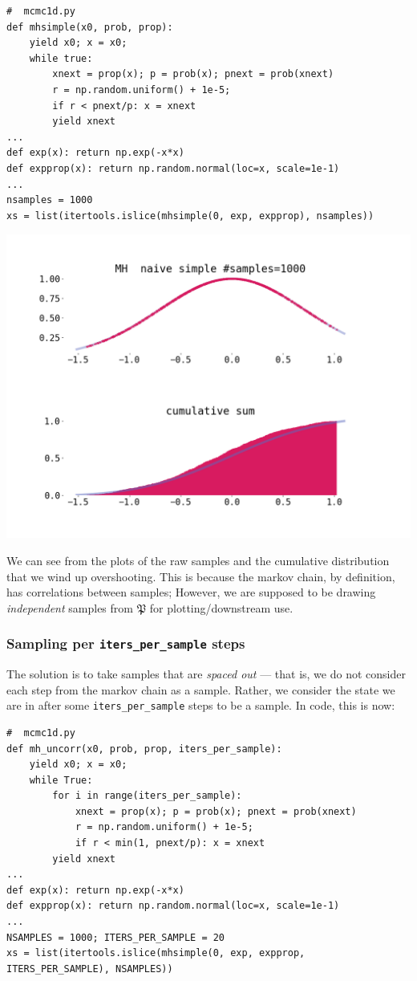 \documentclass[titlepage]{article}
\renewcommand{\P}{\mathfrak{P}}
\begin{document}
{\footnotesize
\begin{verbatim}
#  mcmc1d.py
def mhsimple(x0, prob, prop):
    yield x0; x = x0;
    while true:
        xnext = prop(x); p = prob(x); pnext = prob(xnext)
        r = np.random.uniform() + 1e-5;
        if r < pnext/p: x = xnext
        yield xnext
...
def exp(x): return np.exp(-x*x)
def expprop(x): return np.random.normal(loc=x, scale=1e-1)
...
nsamples = 1000
xs = list(itertools.islice(mhsimple(0, exp, expprop), nsamples))
\end{verbatim}
}

\includegraphics[width=\textwidth]{mcmc-mh-simple-1d-exp.png}

We can see from the plots of the raw samples and the cumulative distribution
that we wind up overshooting. This is because the markov chain, by definition,
has correlations between samples; However, we are supposed to be drawing
\emph{independent} samples from $\P$ for plotting/downstream use.

\subsubsection{Sampling per \texttt{iters\_per\_sample} steps}

The solution is to take samples that are \emph{spaced out} --- that is,
we do not consider each step from the markov chain as a sample. Rather,
we consider the state we are in after some \texttt{iters\_per\_sample} steps to be a sample.
In code, this is now:

{\footnotesize
\begin{verbatim}
#  mcmc1d.py
def mh_uncorr(x0, prob, prop, iters_per_sample):
    yield x0; x = x0;
    while True:
        for i in range(iters_per_sample):
            xnext = prop(x); p = prob(x); pnext = prob(xnext)
            r = np.random.uniform() + 1e-5;
            if r < min(1, pnext/p): x = xnext
        yield xnext
...
def exp(x): return np.exp(-x*x)
def expprop(x): return np.random.normal(loc=x, scale=1e-1)
...
NSAMPLES = 1000; ITERS_PER_SAMPLE = 20
xs = list(itertools.islice(mhsimple(0, exp, expprop, ITERS_PER_SAMPLE), NSAMPLES))
\end{verbatim}
}
\end{document}
